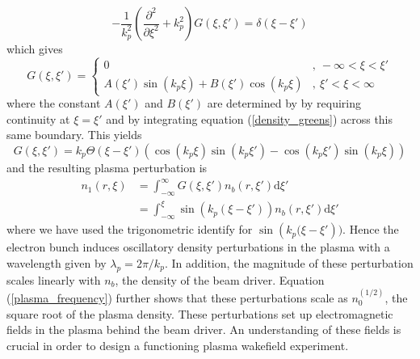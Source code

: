 \begin{equation}
-\frac{1}{k_p^2}\left(\frac{\partial^2 }{\partial \xi^2}+k_p^2\right)G\left(\xi,\xi'\right)=\delta\left(\xi-\xi'\right)
\label{density_greens}
\end{equation}
which gives
\begin{equation}
G\left(\xi,\xi'\right)=\left\{ \begin{array}{ll}
0 &,~ -\infty<\xi<\xi'\\
A(\xi')\sin\left(k_p\xi \right) + B(\xi')\cos\left(k_p\xi \right) &,~ \xi'<\xi<\infty
\end{array}\right.
\end{equation}
where  the constant $A(\xi')$ and $B(\xi')$ are determined by by requiring continuity at $\xi=\xi'$ and by integrating equation (\ref{density_greens}) across this same boundary. This yields 
\begin{equation}
G\left(\xi,\xi'\right)=k_p\Theta(\xi-\xi')\left(\cos(k_p\xi)\sin(k_p\xi')-\cos(k_p\xi')\sin(k_p\xi)\right)
\end{equation}
and the resulting plasma perturbation is
\begin{equation}
\begin{aligned}
n_1\left(r,\xi \right)&=\int_{-\infty}^{\infty}G\left(\xi,\xi'\right)n_b\left(r,\xi' \right) \mathrm{d}\xi'\\
&=\int_{-\infty}^{\xi}\sin\left(k_p(\xi-\xi')\right)n_b\left(r,\xi' \right) \mathrm{d}\xi'
\end{aligned}
\label{density_perturbation}
\end{equation}
where we have used the trigonometric identify for $\sin\left(k_p(\xi-\xi'\right))$. Hence the electron bunch induces oscillatory density perturbations in the plasma with a wavelength given by $\lambda_p=2\pi/k_p$. In addition, the magnitude of these perturbation scales linearly with $n_b$, the density of the beam driver. Equation (\ref{plasma_frequency}) further shows that these perturbations scale as $n_0^(1/2)$, the square root of the plasma density. These perturbations set up electromagnetic fields in the plasma behind the beam driver. An understanding of these fields is crucial in order to design a functioning plasma wakefield experiment.
